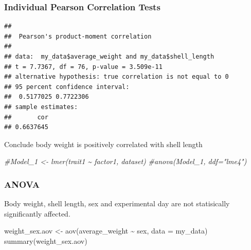 \documentclass[
]{article}
\newenvironment{Shaded}{\begin{snugshade}}{\end{snugshade}}
\newcommand{\AttributeTok}[1]{\textcolor[rgb]{0.77,0.63,0.00}{#1}}
\newcommand{\CommentTok}[1]{\textcolor[rgb]{0.56,0.35,0.01}{\textit{#1}}}
\newcommand{\FunctionTok}[1]{\textcolor[rgb]{0.00,0.00,0.00}{#1}}
\newcommand{\NormalTok}[1]{#1}
\newcommand{\OtherTok}[1]{\textcolor[rgb]{0.56,0.35,0.01}{#1}}
\newcommand{\SpecialCharTok}[1]{\textcolor[rgb]{0.00,0.00,0.00}{#1}}
\newcommand{\StringTok}[1]{\textcolor[rgb]{0.31,0.60,0.02}{#1}}
\begin{document}
\hypertarget{individual-pearson-correlation-tests}{%
\subsubsection{Individual Pearson Correlation
Tests}\label{individual-pearson-correlation-tests}}

\begin{Shaded}
\end{Shaded}

\begin{verbatim}
## 
##  Pearson's product-moment correlation
## 
## data:  my_data$average_weight and my_data$shell_length
## t = 7.7367, df = 76, p-value = 3.509e-11
## alternative hypothesis: true correlation is not equal to 0
## 95 percent confidence interval:
##  0.5177025 0.7722306
## sample estimates:
##       cor 
## 0.6637645
\end{verbatim}

Conclude body weight is positively correlated with shell length

\begin{Shaded}
\begin{Highlighting}[]
\CommentTok{\#Model\_1 \textless{}{-} lmer(trait1 \textasciitilde{} factor1, dataset)}
\CommentTok{\#anova(Model\_1, ddf="lme4")}
\end{Highlighting}
\end{Shaded}

\hypertarget{anova}{%
\subsubsection{ANOVA}\label{anova}}

Body weight, shell length, sex and experimental day are not statisically
significantly affected.

\begin{Shaded}
\begin{Highlighting}[]
\NormalTok{weight\_sex.aov }\OtherTok{\textless{}{-}} \FunctionTok{aov}\NormalTok{(average\_weight }\SpecialCharTok{\textasciitilde{}}\NormalTok{ sex, }\AttributeTok{data =}\NormalTok{ my\_data)}
\FunctionTok{summary}\NormalTok{(weight\_sex.aov)}
\end{Highlighting}
\end{Shaded}
\end{document}
